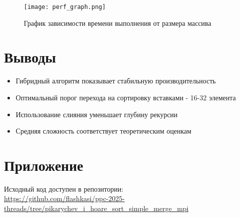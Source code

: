 \documentclass[a4paper,12pt]{article}
\begin{document}
\begin{figure}[h]
\centering
\texttt{[image: perf\_graph.png]}
\caption{График зависимости времени выполнения от размера массива}
\end{figure}

\section{Выводы}
\begin{itemize}
    \item Гибридный алгоритм показывает стабильную производительность
    \item Оптимальный порог перехода на сортировку вставками - 16-32 элемента
    \item Использование слияния уменьшает глубину рекурсии
    \item Средняя сложность соответствует теоретическим оценкам
\end{itemize}

\section*{Приложение}
Исходный код доступен в репозитории: \\
\url{https://github.com/flashkasi/ppc-2025-threads/tree/pikarychev_i_hoare_sort_simple_merge_mpi}
\end{document}
